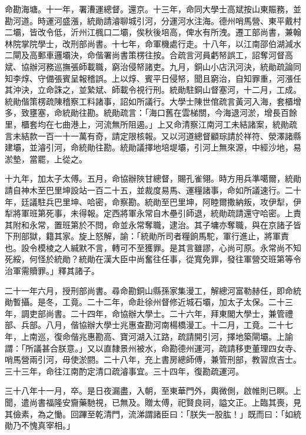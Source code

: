 \begin{pinyinscope}
命勘海塘。十一年，署漕運總督。還京。十三年，命同大學士高斌按山東賑務，並勘河道。時運河盛漲，統勛請濬聊城引河，分運河水注海。德州哨馬營、東平戴村二壩，皆改令低，沂州江楓口二壩，俟秋後培高，俾水有所洩。遷工部尚書，兼翰林院掌院學士，改刑部尚書。十七年，命軍機處行走。十八年，以江南邵伯湖減水二閘及高郵車邏壩決，命偕署尚書策楞往按。合疏言河員虧帑誤工，詔奪河督高斌、協辦河務巡撫張師載職，窮治侵帑諸吏。九月，銅山小店汛河決，統勛疏論同知李焞、守備張賓呈報稽誤。上以焞、賓平日侵帑，聞且窮治，自知罪重，河漲任其沖決，立命誅之，並縶斌、師載令視行刑。統勛駐銅山督塞河，十二月，工成。統勛偕策楞疏陳稽察工料諸事，詔如所議行。大學士陳世倌疏言黃河入海，套櫃增多，致壅塞，命統勛往勘。統勛疏言：「海口舊在雲梯關，今海退河淤，增長百餘里，櫃套均在七曲港上，河流無所阻遏。」上又命清察江南河工未結諸案，統勛疏言未結款一百一十一萬有奇，請定限核報。又以河道總督顧琮請於祥符、滎澤諸縣建壩，並濬引河，命統勛往勘。統勛議擇地培堤壩，引河上無來源，中經沙地，易淤墊，當罷，上從之。

十九年，加太子太傅。五月，命協辦陜甘總督，賜孔雀翎。時方用兵準噶爾，統勛請自神木至巴里坤設站一百二十五，並裁度易馬、運糧諸事，命如所議速行。二十年，廷議駐兵巴里坤、哈密，命察勘。統勛至巴里坤，阿睦爾撒納叛，攻伊犁，伊犁將軍班第死事，未得報。定西將軍永常自木壘引師退，統勛疏請還守哈密。上責其附和永常，置班第於不問，命並永常奪職，逮治。其子墉亦奪職，與在京諸子皆下刑部獄，籍其家。旋上怒解，諭：「統勛所司者糧餉馬駝，軍行進止，將軍責也。設令模棱之人緘默不言，轉可不至獲罪。是其言雖謬，心尚可原。永常尚不知死綏，何怪於統勛？統勛在漢大臣中尚奮往任事，從寬免罪，發往軍營交班第等令治軍需贖罪。」釋其諸子。

二十一年六月，授刑部尚書。尋命勘銅山縣孫家集漫工，解總河富勒赫任，即命統勛暫攝。是冬，工竟。二十二年，命赴徐州督修近城石壩，加太子太保。二十三年，調吏部尚書。二十四年，命協辦大學士。二十六年，拜東閣大學士，兼管禮部、兵部。八月，偕協辦大學士兆惠查勘河南楊橋漫工。十二月，工竟。二十七年，上南巡，復命偕兆惠勘高、寶河湖入江路，疏請開引河，擇地築閘壩。上諭謂：「所議甚合朕意。」又以直隸景州被水，命勘德州運河，疏請移吏董理四女寺、哨馬營兩引河，毋使淤閼。二十八年，充上書房總師傅，兼管刑部，教習庶吉士。三十三年，命往江南酌定清口疏濬事宜。三十四年，復勘疏運河。

三十八年十一月，卒。是日夜漏盡，入朝，至東華門外，輿微側，啟帷則已瞑。上聞，遣尚書福隆安齎藥馳視，已無及。贈太傅，祀賢良祠，謚文正。上臨其喪，見其儉素，為之慟。回蹕至乾清門，流涕謂諸臣曰：「朕失一股肱！」既而曰：「如統勛乃不愧真宰相。」


\end{pinyinscope}
